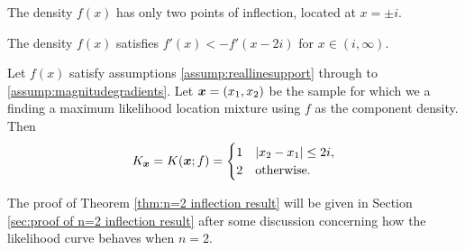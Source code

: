 		\begin{assumption}
			The density $f(x)$ has only two points of inflection, located at $x = \pm i$.
			\label{assump:twoinflectionpoints}
		\end{assumption}


			
		
		\begin{assumption}
			The density $f(x)$ satisfies $f'(x) < -f'(x - 2i)$ for $x \in (i,\infty)$.
			\label{assump:magnitudegradients}
		\end{assumption}

		\begin{theorem}
			\label{thm:n=2 inflection result}
			Let $f(x)$ satisfy assumptions \ref{assump:reallinesupport} through to \ref{assump:magnitudegradients}. Let ${\bm{{x}}} = (x_1,x_2)$ be the sample for which we a finding a maximum likelihood location mixture using $f$ as the component density. Then 
			\begin{equation}
				K_{\bm{{x}}} = K({\bm{{x}}};f) = 
					\begin{cases}
						1 &|x_2 - x_1| \leq 2i,\\
						2 &\text{otherwise.}
					\end{cases}
			\end{equation}
		\end{theorem}

		The proof of Theorem \ref{thm:n=2 inflection result} will be given in Section \ref{sec:proof of n=2 inflection result} after some discussion concerning how the likelihood curve behaves when $n = 2$.

